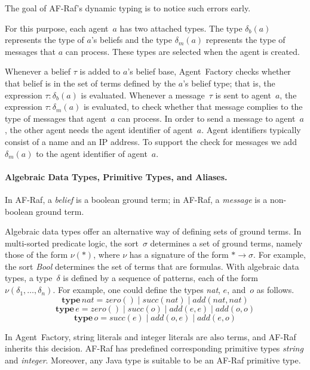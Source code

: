 \documentclass[a4paper,12pt,oneside,fleqn]{book} %
\begin{document}
The goal of AF-Raf's dynamic typing is to notice such errors early.

For this purpose, each agent~$a$ has two attached types. The type $\delta_b(a)$
represents the type of $a$'s beliefs and the type $\delta_m(a)$ represents the
type of messages that $a$ can process. These types are selected when the agent
is created.

Whenever a belief $\tau$ is added to $a$'s belief base, Agent~Factory checks
whether that belief is in the set of terms defined by the $a$'s belief type;
that is, the expression $\tau:\delta_b(a)$ is evaluated.  Whenever a
message~$\tau$ is sent to agent~$a$, the expression $\tau:\delta_m(a)$ is
evaluated, to check whether that message complies to the type of messages that
agent~$a$ can process. In order to send a message to agent~$a$, the other agent
needs the agent identifier of agent~$a$. Agent identifiers typically consist of
a name and an IP address. To support the check for messages we add
$\delta_m(a)$ to the agent identifier of agent~$a$.

\paragraph{Algebraic Data Types, Primitive Types, and Aliases.}

In AF-Raf, a \emph{belief} is a boolean ground term; in AF-Raf, a
\emph{message} is a non-boolean ground term.

Algebraic data types offer an alternative way of defining sets of ground
terms. In multi-sorted predicate logic, the sort~$\sigma$ determines a set
of ground terms, namely those of the form $\nu(*)$, where $\nu$ has a
signature of the form $*\to\sigma$.  For example, the sort \textit{Bool}
determines the set of terms that are formulas.  With algebraic data types,
a type~$\delta$ is defined by a sequence of patterns, each of the form
$\nu(\delta_1,\ldots,\delta_n)$. For example, one could define the types
\textit{nat}, $e$, and~$o$ as follows.
\[\mathbf{type}\,\mathit{nat} =
  \mathit{zero}()
  \mid\mathit{succ}(\mathit{nat})
  \mid\mathit{add}(\mathit{nat},\mathit{nat})\]
\[\mathbf{type}\,e =
  \mathit{zero}()
  \mid\mathit{succ}(o)
  \mid\mathit{add}(e,e)
  \mid\mathit{add}(o,o)\]
\[\mathbf{type}\,o =
  \mathit{succ}(e)
  \mid\mathit{add}(o,e)
  \mid\mathit{add}(e,o)\]

In Agent~Factory, string literals and integer literals are
also terms, and AF-Raf inherits this decision. AF-Raf has
predefined corresponding primitive types \textit{string} and
\textit{integer}. Moreover, any Java type is suitable to be an AF-Raf
primitive type.
\end{document}
